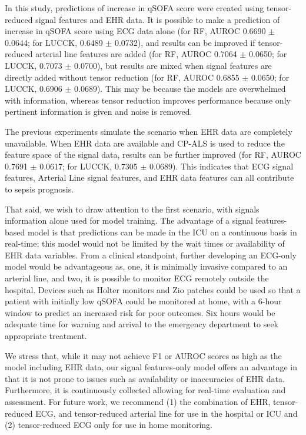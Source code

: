 
In this study, predictions of increase in qSOFA score were created using tensor-reduced signal features and EHR data. It is possible to make a prediction of increase in qSOFA score using ECG data alone (for RF, AUROC 0.6690 $\pm$ 0.0644; for LUCCK, 0.6489 $\pm$ 0.0732), and results can be improved if tensor-reduced arterial line features are added (for RF, AUROC 0.7064 $\pm$ 0.0650; for LUCCK, 0.7073 $\pm$ 0.0700), but results are mixed when signal features are directly added without tensor reduction (for RF, AUROC 0.6855 $\pm$ 0.0650; for LUCCK, 0.6906 $\pm$ 0.0689). This may be because the models are overwhelmed with information, whereas tensor reduction improves performance because only pertinent information is given and noise is removed. 

The previous experiments simulate the scenario when EHR data are completely unavailable. When EHR data are available and CP-ALS is used to reduce the feature space of the signal data, results can be further improved (for RF, AUROC 0.7691 $\pm$ 0.0617; for LUCCK, 0.7305 $\pm$ 0.0689). This indicates that ECG signal features, Arterial Line signal features, and EHR data features can all contribute to sepsis prognosis. 

That said, we wish to draw attention to the first scenario, with signals information alone used for model training. The advantage of a signal features-based model is that predictions can be made in the ICU on a continuous basis in real-time; this model would not be limited by the wait times or availability of EHR data variables. From a clinical standpoint, further developing an ECG-only model would be advantageous as, one, it is minimally invasive compared to an arterial line, and two, it is possible to monitor ECG remotely outside the hospital. Devices such as Holter monitors and Zio patches could be used so that a patient with initially low qSOFA could be monitored at home, with a 6-hour window to predict an increased risk for poor outcomes. Six hours would be adequate time for warning and arrival to the emergency department to seek appropriate treatment.

We stress that, while it may not achieve F1 or AUROC scores as high as the model including EHR data, our signal features-only model offers an advantage in that it is not prone to issues such as availability or inaccuracies of EHR data. Furthermore, it is continuously collected allowing for real-time evaluation and assessment. For future work, we recommend (1) the combination of EHR, tensor-reduced ECG, and tensor-reduced arterial line for use in the hospital or ICU and (2) tensor-reduced ECG only for use in home monitoring.